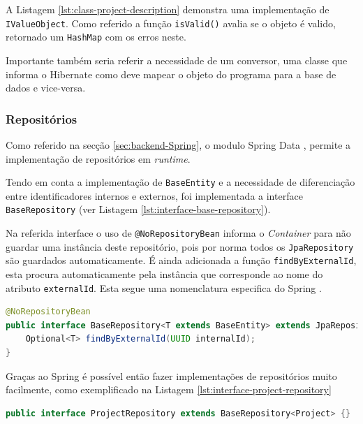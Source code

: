A Listagem \ref{lst:class-project-description} demonstra uma implementação de \lstinline|IValueObject|. Como referido a função \lstinline|isValid()| avalia se o objeto é valido, retornado um \lstinline|HashMap| com os erros neste.

Importante também seria referir a necessidade de um conversor, uma classe que informa o \gls{Hibernate} como deve mapear o objeto do programa para a base de dados e vice-versa.







\subsubsection{Repositórios}

Como referido na secção \ref{sec:backend-Spring}, o modulo Spring Data , permite a implementação de repositórios em \textit{runtime}.

Tendo em conta a implementação de \lstinline|BaseEntity| e a necessidade de diferenciação entre identificadores internos e externos, foi implementada a interface \lstinline|BaseRepository| (ver Listagem \ref{lst:interface-base-repository}). 

Na referida interface o uso de \lstinline|@NoRepositoryBean| informa o  \textit{Container} para não guardar uma instância deste repositório, pois por norma todos os \lstinline|JpaRepository| são guardados automaticamente. É ainda adicionada a função \lstinline|findByExternalId|, esta procura automaticamente pela instância que corresponde ao nome do atributo \lstinline|externalId|. Esta segue uma nomenclatura especifica do Spring \cite{docs-spring-repository}.

\begin{lstlisting}[language=Java,caption={Inteface BaseRepository}, label={lst:interface-base-repository}]
@NoRepositoryBean
public interface BaseRepository<T extends BaseEntity> extends JpaRepository<T, UUID> {
    Optional<T> findByExternalId(UUID internalId);
}
\end{lstlisting}

Graças ao \gls{Spring} é possível então fazer implementações de repositórios muito facilmente, como exemplificado na Listagem \ref{lst:interface-project-repository}

\begin{lstlisting}[language=Java, caption={interface \textit{ProjectRepository}}, label={lst:interface-project-repository}]
    public interface ProjectRepository extends BaseRepository<Project> {}
\end{lstlisting}







